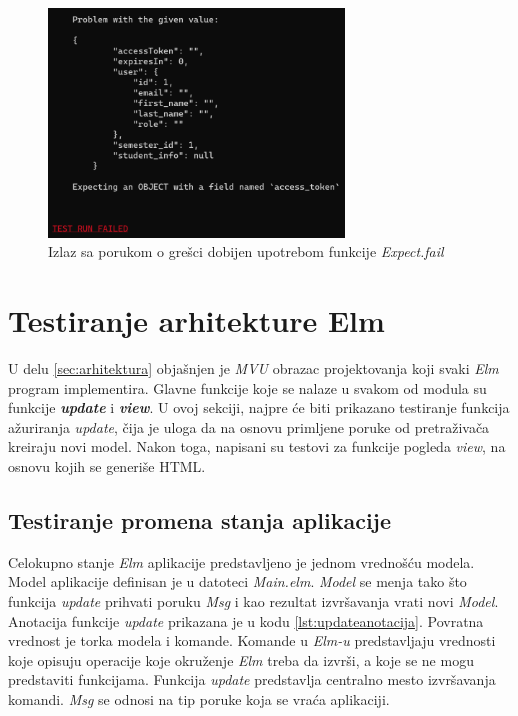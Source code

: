 \documentclass[12pt,oneside]{memoir}
\begin{document}
\begin{figure}[!ht]
  \centering
  \label{fig:expfail}
  \includegraphics[width=0.7\textwidth]{expfail.png}
  \caption{Izlaz sa porukom o grešci dobijen upotrebom funkcije \emph{Expect.fail}}
\end{figure}

\section{Testiranje arhitekture Elm}
\par U delu \ref{sec:arhitektura} objašnjen je \emph{MVU} obrazac projektovanja koji svaki \emph{Elm} program implementira. Glavne funkcije koje se nalaze u svakom od modula su funkcije \textbf{\emph{update}} i \emph{\textbf{view}}. U ovoj sekciji, najpre će biti prikazano testiranje funkcija ažuriranja \emph{update}, čija je uloga da na osnovu primljene poruke od pretraživača kreiraju novi model. Nakon toga, napisani su testovi za funkcije pogleda \emph{view}, na osnovu kojih se generiše HTML.

\subsection{Testiranje promena stanja aplikacije}

\par Celokupno stanje \emph{Elm} aplikacije predstavljeno je jednom vrednošću modela. Model aplikacije definisan je u datoteci \emph{Main.elm}. \emph{Model} se menja tako što funkcija \emph{update} prihvati poruku \emph{Msg} i kao rezultat izvršavanja vrati novi \emph{Model}. Anotacija funkcije \emph{update} prikazana je u kodu \ref{lst:updateanotacija}. Povratna vrednost je torka modela i komande.  Komande u \emph{Elm-u} predstavljaju vrednosti koje opisuju operacije koje okruženje \emph{Elm} treba da izvrši, a koje se ne mogu predstaviti funkcijama. Funkcija \emph{update} predstavlja centralno mesto izvršavanja komandi. \emph{Msg} se odnosi na tip poruke koja se vraća aplikaciji. 
\end{document}
